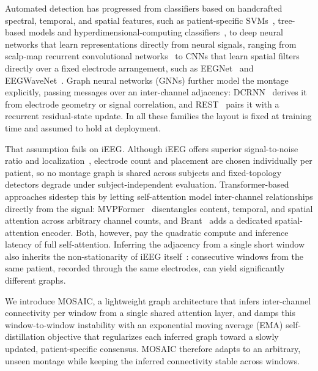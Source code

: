 \documentclass[letterpaper]{article}
\begin{document}
Automated detection has progressed from classifiers based on  handcrafted spectral,
temporal, and spatial features, such as patient-specific
SVMs~\cite{shoeb2010application}, tree-based models \cite{shoaran2018energy, shin2022neuraltree} and hyperdimensional-computing
classifiers~\cite{burrello2019hyperdimensional}, to deep neural networks that learn representations directly from neural signals, ranging from scalp-map recurrent
convolutional networks~\cite{thodoroff2016learning} to CNNs that learn
spatial filters directly over a fixed electrode arrangement, such as
EEGNet~\cite{lawhern2018eegnet} and
EEGWaveNet~\cite{thuwajit2021eegwavenet}. Graph neural networks (GNNs)
further model the montage explicitly, passing messages over an
inter-channel adjacency: DCRNN~\cite{tang2022selfsupervised} derives it
from electrode geometry or signal correlation, and
REST~\cite{afzal2024rest} pairs it with a recurrent residual-state
update. In all these families the layout is fixed at training time and
assumed to hold at deployment.

That assumption fails on iEEG. Although iEEG offers superior
signal-to-noise ratio and localization~\cite{parvizi2018promises},
electrode count and placement are chosen individually per patient, so no
montage graph is shared across subjects and fixed-topology detectors
degrade under subject-independent evaluation. Transformer-based
approaches sidestep this by letting self-attention model inter-channel relationships directly from the signal: MVPFormer~\cite{carzaniga2026foundation}
disentangles content, temporal, and spatial attention across arbitrary
channel counts, and Brant~\cite{zhang2023brant} adds a dedicated
spatial-attention encoder. Both, however, pay the quadratic compute and
inference latency of full self-attention. Inferring the adjacency from a
single short window also inherits the non-stationarity of iEEG
itself~\cite{dikanev2005eeg}: consecutive windows from the same patient,
recorded through the same electrodes, can yield significantly different
graphs.

We introduce MOSAIC, a lightweight graph architecture that infers
inter-channel connectivity per window from a single shared attention
layer, and damps this window-to-window instability with an exponential moving average (EMA)
self-distillation objective that regularizes each inferred graph toward a
slowly updated, patient-specific consensus. MOSAIC therefore adapts to an 
arbitrary, unseen montage while keeping the inferred connectivity stable across windows.
\end{document}
